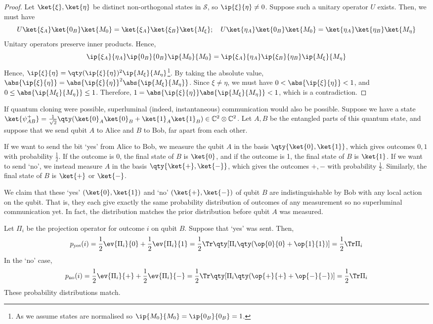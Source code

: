 \begin{proof}
    Let $\ket{\xi}, \ket{\eta}$ be distinct non-orthogonal states in $\mathcal S$, so $\ip{\xi}{\eta} \neq 0$.
    Suppose such a unitary operator $U$ exists.
    Then, we must have
    \[ U \ket{\xi_A}\ket{0_B}\ket{M_0} = \ket{\xi_A}\ket{\xi_B}\ket{M_\xi};\quad U \ket{\eta_A}\ket{0_B}\ket{M_0} = \ket{\eta_A}\ket{\eta_B}\ket{M_\eta} \]
    Unitary operators preserve inner products.
    Hence,
    \[ \ip{\xi_A}{\eta_A} \ip{0_B}{0_B} \ip{M_0}{M_0} = \ip{\xi_A}{\eta_A} \ip{\xi_B}{\eta_B} \ip{M_\xi}{M_\eta} \]
    Hence, $\ip{\xi}{\eta} = \qty(\ip{\xi}{\eta})^2 \ip{M_\xi}{M_\eta}$\footnote{As we assume states are normalised so $\ip{M_0}{M_0} = \ip{0_B}{0_B} = 1$.}.
    By taking the absolute value, $\abs{\ip{\xi}{\eta}} = \abs{\ip{\xi}{\eta}}^2 \abs{\ip{M_\xi}{M_\eta}}$.
    Since $\xi \neq \eta$, we must have $0 < \abs{\ip{\xi}{\eta}} < 1$, and $0 \leq \abs{\ip{M_\xi}{M_\eta}} \leq 1$.
    Therefore, $1 = \abs{\ip{\xi}{\eta}} \abs{\ip{M_\xi}{M_\eta}} < 1$, which is a contradiction.
\end{proof}
If quantum cloning were possible, superluminal (indeed, instantaneous) communication would also be possible.
Suppose we have a state $\ket{\psi^+_{AB}} = \frac{1}{\sqrt{2}} \qty(\ket{0}_A \ket{0}_B + \ket{1}_A \ket{1}_B) \in \mathbb C^2 \otimes \mathbb C^2$.
Let $A, B$ be the entangled parts of this quantum state, and suppose that we send qubit $A$ to Alice and $B$ to Bob, far apart from each other.

If we want to send the bit `yes' from Alice to Bob, we measure the qubit $A$ in the basis $\qty{\ket{0}, \ket{1}}$, which gives outcomes $0, 1$ with probability $\frac{1}{2}$.
If the outcome is 0, the final state of $B$ is $\ket{0}$, and if the outcome is 1, the final state of $B$ is $\ket{1}$.
If we want to send `no', we instead measure $A$ in the basis $\qty{\ket{+}, \ket{-}}$, which gives the outcomes $+, -$ with probability $\frac{1}{2}$.
Similarly, the final state of $B$ is $\ket{+}$ or $\ket{-}$.

We claim that these `yes' $(\ket{0}, \ket{1})$ and `no' $(\ket{+}, \ket{-})$  of qubit $B$ are indistinguishable by Bob with any local action on the qubit.
That is, they each give exactly the same probability distribution of outcomes of any measurement so no superluminal communication yet.
In fact, the distribution matches the prior distribution before qubit $A$ was measured.

Let $\Pi_i$ be the projection operator for outcome $i$ on qubit $B$.
Suppose that `yes' was sent.
Then,
\[ p_{\text{yes}}(i) = \frac{1}{2}\ev{\Pi_i}{0} + \frac{1}{2}\ev{\Pi_i}{1} = \frac{1}{2} \Tr \qty[\Pi_i \qty(\op{0}{0} + \op{1}{1})] = \frac{1}{2} \Tr \Pi_i \]
In the `no' case,
\[ p_{\text{no}}(i) = \frac{1}{2}\ev{\Pi_i}{+} + \frac{1}{2}\ev{\Pi_i}{-} = \frac{1}{2} \Tr \qty[\Pi_i \qty(\op{+}{+} + \op{-}{-})] = \frac{1}{2} \Tr \Pi_i \]
These probability distributions match.

